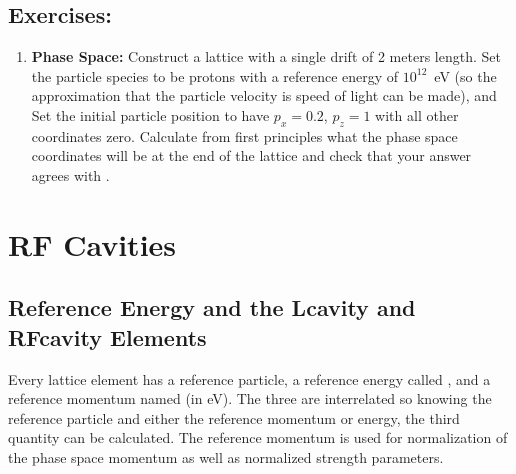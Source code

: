 \documentclass{hitec}     %
\begin{document}
{%

\subsection{Exercises:}

\begin{enumerate}[leftmargin=*]
\item {\bf Phase Space:} Construct a lattice with a single drift of 2 meters length.
Set the particle species to be protons with a reference energy of $10^{12}$~eV (so the approximation
that the particle velocity is speed of light can be made), and
Set the initial particle position to have $p_x = 0.2$, $p_z = 1$ with all other coordinates
zero. Calculate from first principles what the phase space coordinates will be at the end of the
lattice and check that your answer agrees with \bmad.
\end{enumerate}

\newpage

\section{RF Cavities}
\label{s:rf}

\subsection{Reference Energy and the Lcavity and RFcavity Elements}
\label{s:ref.energy}


\begin{description}[labelindent=-17pt,leftmargin=0pt]
\item[Reference Energy] \Newline
Every lattice element has a reference particle, a reference energy called , and a
reference momentum named  (in eV). The three are interrelated so knowing the reference
particle and either the reference momentum or energy, the third quantity can be calculated. The
reference momentum is used for normalization of the phase space momentum
as well as normalized strength parameters. 


\end{description}}
\end{document}
